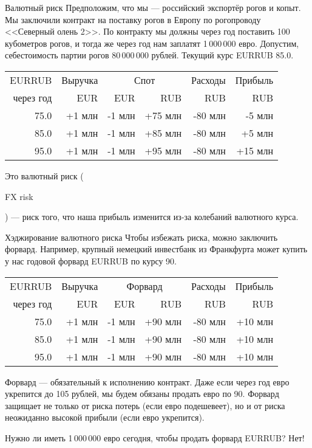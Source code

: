 \documentclass{beamer}
\newcommand{\en}[1]{\begin{otherlanguage}{english}#1\end{otherlanguage}}
\begin{document}
\begin{frame}{Валютный риск}
\justify
Предположим, что мы --- российский экспортёр рогов и копыт. Мы заключили контракт на поставку рогов в Европу по рогопроводу <<Северный олень 2>>. По контракту мы должны через год поставить 100 кубометров рогов, и тогда же через год нам заплатят 1\,000\,000 евро. Допустим, себестоимость партии рогов 80\,000\,000 рублей. Текущий курс EURRUB 85.0.

\justify
\centering
\begin{tabular}{r|r|r|r|r|r}
EURRUB      & Выручка & \multicolumn{2}{c|}{Спот} & Расходы & Прибыль \\
\cline{3-4}
через год   & EUR     & EUR    & RUB              & RUB     & RUB   \\ \hline
75.0        & +1 млн  & -1 млн & +75 млн          & -80 млн & -5 млн \\
85.0        & +1 млн  & -1 млн & +85 млн          & -80 млн & +5 млн \\
95.0        & +1 млн  & -1 млн & +95 млн          & -80 млн & +15 млн
\end{tabular}

\justify
Это \alert{валютный риск} (\en{FX risk}) --- риск того, что наша прибыль изменится из-за колебаний валютного курса.
\end{frame}



\begin{frame}{Хэджирование валютного риска}
\justify
Чтобы избежать риска, можно заключить форвард. Например, крупный немецкий инвестбанк из 
Франкфурта может купить у нас годовой форвард EURRUB по курсу 90.

\justify
\centering
\begin{tabular}{r|r|r|r|r|r}
EURRUB      & Выручка & \multicolumn{2}{c|}{Форвард} & Расходы & Прибыль \\
\cline{3-4}
через год   & EUR     & EUR    & RUB              & RUB     & RUB   \\ \hline
75.0        & +1 млн  & -1 млн & +90 млн          & -80 млн & +10 млн \\
85.0        & +1 млн  & -1 млн & +90 млн          & -80 млн & +10 млн \\
95.0        & +1 млн  & -1 млн & +90 млн          & -80 млн & +10 млн
\end{tabular}

\justify
Форвард --- обязательный к исполнению контракт. Даже если через год евро укрепится до 
105 рублей, мы будем обязаны продать евро по 90. Форвард защищает не только от риска 
потерь (если евро подешевеет), но и от риска неожиданно высокой прибыли (если евро 
укрепится).

\justify
Нужно ли иметь 1\,000\,000 евро сегодня, чтобы продать форвард EURRUB? Нет!
\end{frame}
\end{document}
